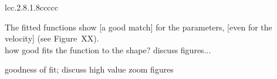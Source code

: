 \begin{table}[htb]
\begin{tabular}{lcc.{2.8}.{1.8}ccccc}
		\bottomrule
	\end{tabular}
	\label{tab:double_lognormal_fit_parameters}
\end{table}

The fitted functions show [a good match] for the parameters, [even for the velocity] (see Figure~XX).\\
how good fits the function to the shape? discuss figures...
\begin{figure}[htb]
\end{figure}

goodness of fit; discuss high value zoom figures\\

